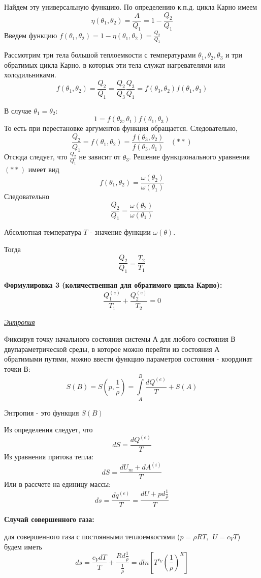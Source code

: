 Найдем эту универсальную функцию.  По определению к.п.д. цикла Карно имеем
$$ \eta(\theta_1, \theta_2) = \frac{A}{Q_1} = 1 - \frac{Q_2}{Q_1} $$
Введем функцию $f(\theta_1, \theta_2) = 1 - \eta(\theta_1, \theta_2) = \frac{Q_2}{Q_1}$

Рассмотрим три тела большой теплоемкости с температурами $\theta_1, \theta_2, \theta_3$ и три обратимых цикла Карно, в которых эти тела служат нагревателями или холодильниками.
$$ f(\theta_1, \theta_2) = \frac{Q_2}{Q_1} = \frac{Q_2}{Q_3}\frac{Q_3}{Q_1} = f(\theta_3, \theta_2)f(\theta_1, \theta_3) $$

В случае $\theta_1 = \theta_2$:
$$ 1 = f(\theta_3, \theta_1)f(\theta_1, \theta_3) $$
То есть при перестановке аргументов функция обращается. Следовательно,
$$ \frac{Q_2}{Q_1} = f(\theta_1, \theta_2) = \frac{f(\theta_3, \theta_2)}{f(\theta_3, \theta_1)} \ \ \ \ (**)$$
Отсюда следует, что $\frac{Q_2}{Q_1}$ не зависит от $\theta_3$.  Решение функционального уравнения $(**)$ имеет вид
$$ f(\theta_1, \theta_2) = \frac{\omega(\theta_2)}{\omega(\theta_1)} $$
Следовательно $$ \frac{Q_2}{Q_1} = \frac{\omega(\theta_2)}{\omega(\theta_1)} $$

\begin{defn}
  Абсолютная температура $T$ - значение функции $\omega(\theta)$.
\end{defn}

Тогда $$ \frac{Q_2}{Q_1} = \frac{T_2}{T_1} $$

\textbf{Формулировка 3 (количественная для обратимого цикла Карно):}
$$ \frac{Q_1^{(e)}}{T_1} + \frac{Q_2^{(e)}}{T_2} = 0 $$


\begin{center}
  \textit{\underline{Энтропия}}
\end{center}

Фиксируя точку начального состояния системы А для любого состояния В двупараметрической среды, в которое можно перейти из состояния А обратимыми путями, можно ввести функцию параметров состояния - координат точки В:
$$ S(B) = S\left(p, \frac{1}{\rho}\right) = \int\limits_{A}^{B}\frac{dQ^{(e)}}{T} + S(A) $$

\begin{defn}
  Энтропия - это функция $S(B)$
\end{defn}

Из определения следует, что $$ dS = \frac{dQ^{(e)}}{T} $$
Из уравнения притока тепла:
$$ dS = \frac{dU_m + dA^{(i)}}{T} $$
Или в рассчете на единицу массы:
$$ ds = \frac{dq^{(e)}}{T} = \frac{dU + pd\frac{1}{\rho}}{T} $$

\textbf{Случай совершенного газа:}

для совершенного газа с постоянными теплоемкостями ($p = \rho R T, \ \ U = c_V T$) будем иметь
$$ ds = \frac{c_VdT}{T} + \frac{Rd\frac{1}{\rho}}{\frac{1}{\rho}} = dln\left[T^{c_V}\left( \frac{1}{\rho} \right)^{R}\right] $$


